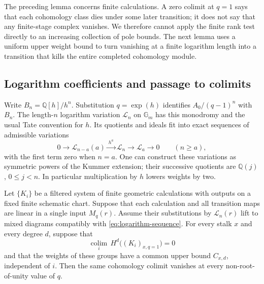 The preceding lemma concerns finite calculations.  A zero colimit at
$q=1$ says that each cohomology class dies under some later transition;
it does not say that any finite-stage complex vanishes.  We therefore
cannot apply the finite rank test directly to an increasing collection
of pole bounds.  The next lemma uses a uniform upper weight bound to
turn vanishing at a finite logarithm length into a transition that
kills the entire completed cohomology module.

\subsection{Logarithm coefficients and passage to colimits}

Write $B_n=\mathbb Q[h]/h^n$.  Substitution $q=\exp(h)$ identifies
$A_0/(q-1)^n$ with $B_n$.  The length-$n$ logarithm variation
$\mathcal L_n$ on $\mathbb G_m$ has this monodromy and the usual
Tate convention for $h$.  Its quotients and ideals fit into exact
sequences of admissible variations
\begin{equation}\label{eq:logarithm-sequence}
 0\longrightarrow\mathcal L_{n-a}(a)
  \xrightarrow{\ h^a\ }\mathcal L_n
  \longrightarrow\mathcal L_a\longrightarrow0
                         \qquad(n\ge a),
\end{equation}
with the first term zero when $n=a$.  One can construct these
variations as symmetric powers of the Kummer extension; their
successive quotients are $\mathbb Q(j)$, $0\le j<n$.
In particular multiplication by $h$ lowers weights by two.

\begin{lemma}\label{deform:colimit}
Let $\{K_i\}$ be a filtered system of finite geometric calculations
with outputs on a fixed finite schematic chart.  Suppose that each
calculation and all transition maps are linear in a single input
$M_q(r)$.  Assume their substitutions by $\mathcal L_n(r)$ lift to
mixed diagrams compatibly with \eqref{eq:logarithm-sequence}.
For every stalk $x$ and every degree $d$, suppose that
\[
 \underset{i}{\operatorname{colim}}\,
 H^d\bigl((K_i)_{x,q=1}\bigr)=0
\]
and that the weights of these groups have a common upper bound
$C_{x,d}$, independent of $i$.  Then the same cohomology colimit
vanishes at every non-root-of-unity value of $q$.
\end{lemma}

